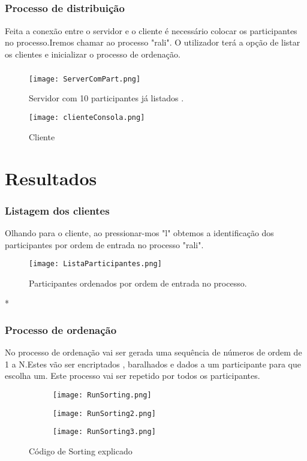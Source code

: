 \documentclass{report}
\begin{document}
\pagebreak
\paragraph{}

\subsection{Processo de distribuição}
	Feita a conexão entre o servidor e o cliente é necessário colocar os participantes no processo.Iremos chamar ao processo "rali".
	O utilizador terá a opção de listar os clientes e inicializar o processo de ordenação.
	\paragraph{}
\begin{figure}[hbt!]
  \centering
  \texttt{[image: ServerComPart.png]}
  \caption{Servidor com 10 participantes já listados .}
\end{figure}

\begin{figure}[hbt!]
  \centering
  \texttt{[image: clienteConsola.png]}
  \caption{Cliente}
\end{figure}

	

\chapter{Resultados}
\subsection{Listagem dos clientes}
Olhando para o cliente, ao pressionar-mos "l" obtemos a identificação dos participantes por ordem de entrada no processo "rali".
\begin{figure}[hbt!]
  \centering
  \texttt{[image: ListaParticipantes.png]}
  \caption{Participantes ordenados por ordem de entrada no processo.}
\end{figure}*
\subsection{Processo de ordenação}
No processo de ordenação vai ser gerada uma sequência de números de ordem de 1 a N.Estes vão ser encriptados , baralhados e dados a um participante para que escolha um. Este processo vai ser repetido por todos os participantes.
\begin{figure}[hbt!]
\centering
\begin{subfigure}{.5\textwidth}
  \centering
  \texttt{[image: RunSorting.png]}
  \caption{}
\end{subfigure}%
\begin{subfigure}{.5\textwidth}
  \centering
  \texttt{[image: RunSorting2.png]}
  \caption{}
\end{subfigure}
\begin{subfigure}{.5\textwidth}
  \centering
  \texttt{[image: RunSorting3.png]}
  \caption{}
\end{subfigure}%
	\caption{Código de Sorting explicado}
\end{figure}
\end{document}
